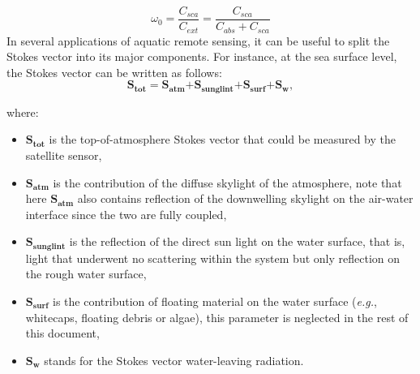 \documentclass{article}
\begin{document}
\begin{equation}
\label{ssa:equation}
{{\omega }_{0}}=\frac{{{C}_{sca}}}{{{C}_{ext}}}=\frac{{{C}_{sca}}}{{{C}_{abs}}+{{C}_{sca}}}
\end{equation}
In several applications of aquatic remote sensing, it can be useful to split the Stokes vector into its major components. For instance, at the sea surface level, the Stokes vector can be written as follows:
\begin{equation}
\label{stokes:equation}
\mathbf{S}_{\mathbf{tot}}^{{}}\mathbf{=}{{\mathbf{S}}_{\mathbf{atm}}}\mathbf{+}{{\mathbf{S}}_{\mathbf{sunglint}}}\mathbf{+}{{\mathbf{S}}_{\mathbf{surf}}}\mathbf{+S}_{\mathbf{w}}^{{}},
\end{equation}

where:
\begin{itemize}
    \item $\mathbf{S_{tot}}$ is the top-of-atmosphere Stokes vector that could be measured by the satellite sensor,
    \item $\mathbf{S_{atm}}$ is the contribution of the diffuse skylight of the atmosphere, note that here $\mathbf{S_{atm}}$ also contains reflection of the downwelling skylight on the air-water interface since the two are fully coupled,
    \item $\mathbf{S_{sunglint}}$ is the reflection of the direct sun light on the water surface, that is, light that underwent no scattering within the system but only reflection on the rough water surface,
    \item  $\mathbf{S_{surf}}$ is the contribution of floating material on the water surface (\textit{e.g.}, whitecaps, floating debris or algae), this parameter is neglected in the rest of this document,
    \item $\mathbf{S_{w}}$ stands for the Stokes vector water-leaving radiation. 
\end{itemize}
\end{document}
